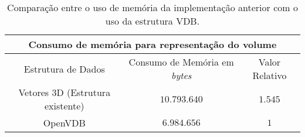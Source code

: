 \begin{table}[!ht]
    \centering
        \begin{tabular}{|c|c|c|}
\hline

\multicolumn{3}{|c|}{\bf{Consumo de memória para representação do volume}} \\
\hline \hline
Estrutura de Dados & Consumo de Memória em {\it bytes} & Valor Relativo\\

\hline
 
Vetores 3D (Estrutura existente) & $10.793.640$ &  $1.545$  \\

\hline
 
OpenVDB & $6.984.656$ & $1$ \\

\hline
 

\end{tabular}
    \caption{Comparação entre o uso de memória da implementação anterior com o uso da estrutura VDB.}
    \label{consumo}
\end{table}

